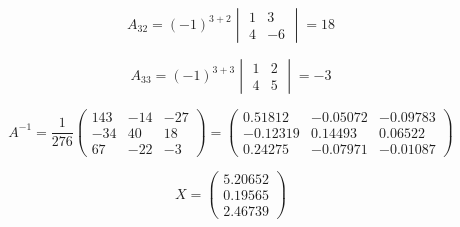 \documentclass{article}
\begin{document}
\[
A_{32} = (-1)^{3+2} \begin{vmatrix}
1 & 3 \\
4 & -6
\end{vmatrix}
 = 18
\]

\[
A_{33} = (-1)^{3+3} \begin{vmatrix}
1 & 2 \\
4 & 5
\end{vmatrix}
 = -3
\]

\[
A^{-1} = \frac{1}{276}\begin{pmatrix}
143 & -14 & -27 \\
-34 & 40 & 18 \\
67 & -22 & -3
\end{pmatrix}
 = \begin{pmatrix}
0.51812 & -0.05072 & -0.09783 \\
-0.12319 & 0.14493 & 0.06522 \\
0.24275 & -0.07971 & -0.01087
\end{pmatrix}
\]

\[
X = \begin{pmatrix}
5.20652 \\
0.19565 \\
2.46739
\end{pmatrix}
\]
\end{document}
